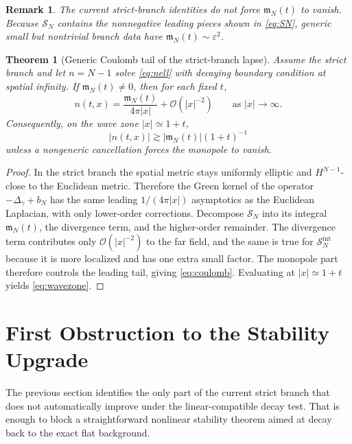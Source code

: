 \documentclass[11pt]{article}
\newtheorem{remark}{Remark}
\newtheorem{theorem}{Theorem}
\begin{document}
\begin{remark}
The current strict-branch identities do not force \(\mathfrak m_N(t)\) to vanish. Because \(\mathcal S_N\) contains the nonnegative leading pieces shown in \eqref{eq:SN}, generic small but nontrivial branch data have \(\mathfrak m_N(t)\sim \varepsilon^2\).
\end{remark}

\begin{theorem}[Generic Coulomb tail of the strict-branch lapse]
Assume the strict branch and let \(n=N-1\) solve \eqref{eq:nell} with decaying boundary condition at spatial infinity. If \(\mathfrak m_N(t)\neq 0\), then for each fixed \(t\),
\begin{equation}
n(t,x)
=
\frac{\mathfrak m_N(t)}{4\pi |x|}
+ \mathcal O(|x|^{-2})
\qquad
\text{as } |x|\to\infty.
\label{eq:coulomb}
\end{equation}
Consequently, on the wave zone \(|x|\simeq 1+t\),
\begin{equation}
|n(t,x)|
\gtrsim
|\mathfrak m_N(t)|(1+t)^{-1}
\label{eq:wavezone}
\end{equation}
unless a nongeneric cancellation forces the monopole to vanish.
\end{theorem}

\begin{proof}
In the strict branch the spatial metric stays uniformly elliptic and \(H^{N-1}\)-close to the Euclidean metric. Therefore the Green kernel of the operator \(-\Delta_\gamma+b_N\) has the same leading \(1/(4\pi|x|)\) asymptotics as the Euclidean Laplacian, with only lower-order corrections. Decompose \(\mathcal S_N\) into its integral \(\mathfrak m_N(t)\), the divergence term, and the higher-order remainder. The divergence term contributes only \(\mathcal O(|x|^{-2})\) to the far field, and the same is true for \(\mathcal S_N^{\mathrm{int}}\) because it is more localized and has one extra small factor. The monopole part therefore controls the leading tail, giving \eqref{eq:coulomb}. Evaluating at \(|x|\simeq 1+t\) yields \eqref{eq:wavezone}.
\end{proof}

\section{First Obstruction to the Stability Upgrade}

The previous section identifies the only part of the current strict branch that does not automatically improve under the linear-compatible decay test. That is enough to block a straightforward nonlinear stability theorem aimed at decay back to the exact flat background.
\end{document}
